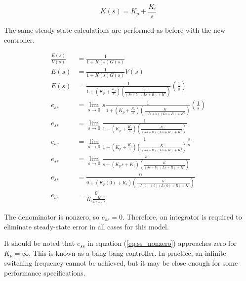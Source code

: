 \begin{equation*}
  K(s) = K_p + \frac{K_i}{s}
\end{equation*}

The same steady-state calculations are performed as before with the new
controller.

\begin{align*}
  \frac{E(s)}{V(s)} &= \frac{1}{1 + K(s)G(s)} \\
  E(s) &= \frac{1}{1 + K(s)G(s)} V(s) \\
  E(s) &= \frac{1}{1 + \left(K_p + \frac{K_i}{s}\right)
    \left(\frac{K}{(Js+b)(Ls+R)+K^2}\right)} \left(\frac{1}{s}\right) \\
  e_{ss} &= \lim_{s\to0} s \frac{1}{1 + \left(K_p + \frac{K_i}{s}\right)
    \left(\frac{K}{(Js+b)(Ls+R)+K^2}\right)} \left(\frac{1}{s}\right) \\
  e_{ss} &= \lim_{s\to0} \frac{1}{1 + \left(K_p + \frac{K_i}{s}\right)
    \left(\frac{K}{(Js+b)(Ls+R)+K^2}\right)} \\
  e_{ss} &= \lim_{s\to0} \frac{1}{1 + \left(K_p + \frac{K_i}{s}\right)
    \left(\frac{K}{(Js+b)(Ls+R)+K^2}\right)} \frac{s}{s} \\
  e_{ss} &= \lim_{s\to0} \frac{s}{s + \left(K_p s + K_i\right)
    \left(\frac{K}{(Js+b)(Ls+R)+K^2}\right)} \\
  e_{ss} &= \frac{0}{0 + (K_p (0) + K_i)
    \left(\frac{K}{(J(0)+b)(L(0)+R)+K^2}\right)} \\
  e_{ss} &= \frac{0}{K_i \frac{K}{bR+K^2}}
\end{align*}

The denominator is nonzero, so $e_{ss} = 0$. Therefore, an integrator is
required to eliminate \gls{steady-state error} in all cases for this
\gls{model}.

It should be noted that $e_{ss}$ in equation (\ref{eq:ss_nonzero}) approaches
zero for $K_p = \infty$. This is known as a bang-bang controller. In practice,
an infinite switching frequency cannot be achieved, but it may be close enough
for some performance specifications.
